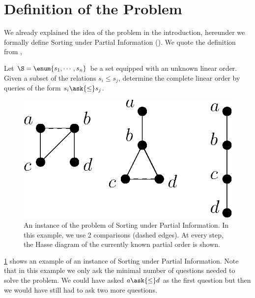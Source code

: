 \section{Definition of the Problem}

We already explained the idea of the problem in the introduction, hereunder we
formally define Sorting under Partial Information ().
We quote the definition from \citet*{cardinal:2013},
\begin{problem}
Let $\S = \enum{s_1 , \cdots , s_n}$ be a set
equipped with an unknown linear order. Given a subset of the relations $s_i
\leq s_j$, determine the complete linear order by queries of the form
\(s_i \ask{\leq} s_j\).
\end{problem}

\begin{figure} \centering \includegraphics[height=0.2\textheight]{fig/supi/ex2}
\caption{An instance of the problem of Sorting under Partial Information. In
this example, we use 2 comparisons (dashed edges). At every step, the Hasse
diagram of the currently known partial order is shown.}
\label{fig:supi:def:ex2} \end{figure}

\ref{fig:supi:def:ex2} shows an example of an instance of Sorting under Partial
Information. Note that in this example we only ask the minimal number of
questions needed to solve the problem. We could have asked $a \ask{\le}
d$ as the first question but then we would have still had to ask two more
questions.
